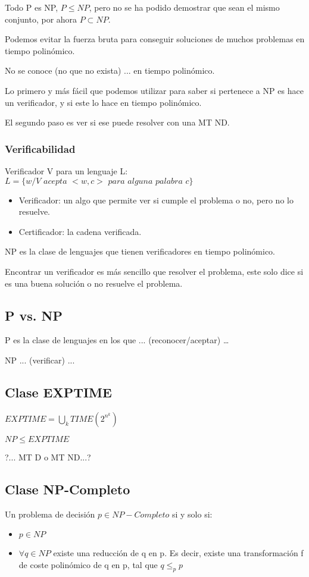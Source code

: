 Todo P es NP, $P \leq NP$, pero no se ha podido demostrar que sean el mismo conjunto, por ahora $P \subset NP$.

Podemos evitar la fuerza bruta para conseguir soluciones de muchos problemas en tiempo polinómico.

No se conoce (no que no exista) ... en tiempo polinómico.

Lo primero y más fácil que podemos utilizar para saber si pertenece a NP es hace un verificador, y si este lo hace en tiempo polinómico.

El segundo paso es ver si ese puede resolver con una MT ND.

\subsubsection{Verificabilidad}
Verificador V para un lenguaje L: $L=\{w / V \textit{ acepta } <w,c> \textit{ para alguna palabra }c\}$
\begin{itemize}
  \item Verificador: un algo que permite ver si cumple el problema o no, pero no lo resuelve.
  \item Certificador: la cadena verificada.
\end{itemize}

NP es la clase de lenguajes que tienen verificadores en tiempo polinómico.

Encontrar un verificador es más sencillo que resolver el problema, este solo dice si es una buena solución o no resuelve el problema.

\subsection{P vs. NP}
P es la clase de lenguajes en los que ... (reconocer/aceptar) \dots

NP ... (verificar) ...

\subsection{Clase EXPTIME}
$EXPTIME= \bigcup_k TIME(2^{n^k})$

$NP \leq EXPTIME$

?... MT D o MT ND...?

\subsection{Clase NP-Completo}
Un problema de decisión $p\in NP-Completo$ si y solo si:
\begin{itemize}
  \item $p \in NP$
  \item $\forall q \in NP$ existe una reducción de q en p. Es decir, existe una transformación f de coste polinómico de q en p, tal que $q \leq_p p$
\end{itemize}

